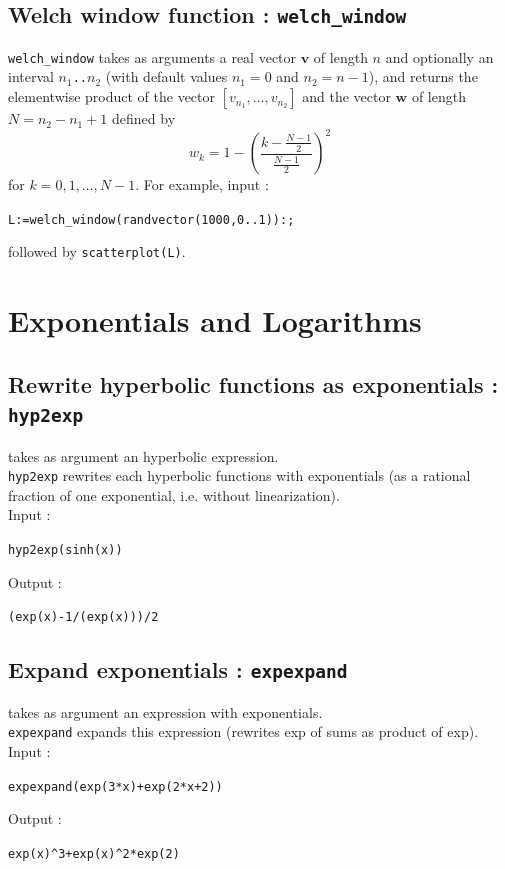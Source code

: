 \documentclass[a4paper,11pt]{book}
\begin{document}
\subsection{Welch window function : {\tt welch\_window}}
{\tt welch\_window} takes as arguments a real vector $ \mathbf{v} $ of length $ n $ and optionally an interval $ n_1 ${\tt ..}$ n_2 $ (with default values $ n_1=0 $ and $ n_2=n-1 $), and returns the elementwise product of the vector $ [v_{n_1},\dots,v_{n_2}] $ and the vector $ \mathbf{w} $ of length $ N=n_2-n_1+1 $ defined by
\[ w_k=1-\left(\frac{k-\frac{N-1}{2}}{\frac{N-1}{2}}\right)^2 \]
for $ k=0,1,\dots,N-1 $. For example, input :
\begin{center}
	{\tt L:=welch\_window(randvector(1000,0..1)):;}
\end{center}
followed by {\tt scatterplot(L)}.

\section{Exponentials and Logarithms}
\subsection{Rewrite hyperbolic functions as exponentials : {\tt hyp2exp}}
 takes as argument an hyperbolic expression.\\
{\tt hyp2exp} rewrites each hyperbolic functions with exponentials
(as a rational fraction of one exponential,
i.e. {\sc without} linearization).\\ 
Input :
\begin{center}{\tt hyp2exp(sinh(x))}\end{center}
Output :
\begin{center}{\tt (exp(x)-1/(exp(x)))/2}\end{center}

\subsection{Expand exponentials : {\tt expexpand}}
 takes as argument an expression with exponentials.\\
{\tt expexpand} expands this expression (rewrites exp of sums as
product of exp).\\
Input :
\begin{center}{\tt expexpand(exp(3*x)+exp(2*x+2))}\end{center}
Output :
\begin{center}{\tt exp(x)\verb|^|3+exp(x)\verb|^|2*exp(2)}\end{center}
\end{document}
